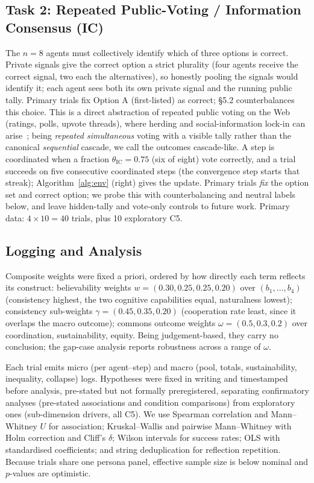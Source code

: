 \documentclass[runningheads]{llncs}
\begin{document}
\subsection{Task 2: Repeated Public-Voting / Information Consensus (IC)}
The $n=8$ agents must collectively identify which of three options is correct. Private signals give
the correct option a strict plurality (four agents receive the correct signal, two each the
alternatives), so honestly pooling the signals would identify it; each agent sees both its own
private signal and the running public tally. Primary trials fix Option A (first-listed) as
correct; §5.2 counterbalances this choice. This is a direct abstraction of repeated public voting on the
Web (ratings, polls, upvote threads), where herding and social-information lock-in can
arise~\cite{bikhchandani1992theory}; being \emph{repeated simultaneous} voting with a visible tally
rather than the canonical \emph{sequential} cascade, we call the outcomes cascade-like. A step is
coordinated when a fraction $\theta_{\mathrm{IC}}=0.75$ (six of eight) vote correctly, and a trial
succeeds on five consecutive coordinated steps (the convergence step starts that streak);
Algorithm~\ref{alg:env} (right) gives the update. Primary trials \emph{fix} the option set and
correct option; we probe this with counterbalancing and neutral labels below, and leave
hidden-tally and vote-only controls to future work. Primary data: $4\times10=40$ trials, plus 10
exploratory C5.


\subsection{Logging and Analysis}
Composite weights were fixed a priori, ordered by how directly each term reflects its construct:
believability weights $w=(0.30,0.25,0.25,0.20)$ over $(b_1,\dots,b_4)$ (consistency highest, the
two cognitive capabilities equal, naturalness lowest); consistency sub-weights
$\gamma=(0.45,0.35,0.20)$ (cooperation rate least, since it overlaps the macro outcome); commons
outcome weights $\omega=(0.5,0.3,0.2)$ over coordination, sustainability, equity. Being
judgement-based, they carry no conclusion; the gap-case analysis reports robustness across a range
of $\omega$.

Each trial emits micro (per agent--step) and macro (pool, totals, sustainability, inequality,
collapse) logs. Hypotheses were fixed in writing and timestamped before analysis, pre-stated but
not formally preregistered, separating confirmatory analyses (pre-stated associations and
condition comparisons) from exploratory ones (sub-dimension drivers, all C5). We use Spearman
correlation and Mann--Whitney $U$ for association; Kruskal--Wallis and pairwise Mann--Whitney with
Holm correction and Cliff's $\delta$; Wilson intervals for success rates; OLS with standardised
coefficients; and string deduplication for reflection repetition. Because trials share one persona
panel, effective sample size is below nominal and $p$-values are optimistic.
\end{document}
